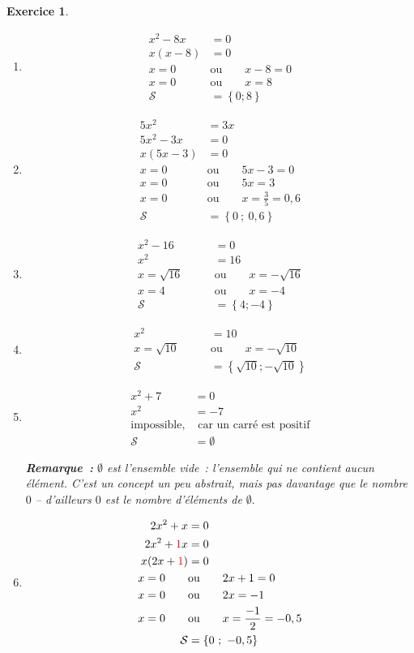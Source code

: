 \documentclass[10pt]{article}
\newtheorem{exo}{Exercice}
\begin{document}
\begin{exo}
\begin{multicols}{2}
\begin{enumerate}
\item \begin{align*}x^2-8x&=0\\
x(x-8)&=0\\
x=0 \qquad &\text{ou}\qquad x-8=0\\
x=0  \qquad &\text{ou}\qquad x=8\\
\mathcal{S}&=\left\{0;8\right\}
\end{align*}
\item \begin{align*}5x^2&=3x\\
5x^2-3x&=0\\
x(5x-3)&=0\\
x=0 \qquad &\text{ou}\qquad 5x-3=0\\
x=0 \qquad &\text{ou}\qquad 5x=3\\
x=0  \qquad &\text{ou}\qquad x=\frac{3}{5}=0,6\\
\mathcal{S}&=\left\{0~;~0,6\right\}
\end{align*}
\item \begin{align*}x^2-16&=0\\
x^2&=16\\
x=\sqrt{16} \qquad &\text{ou}\qquad x=-\sqrt{16}\\
x=4  \qquad &\text{ou}\qquad x=-4\\
\mathcal{S}&=\left\{4;-4\right\}
\end{align*}

\item \begin{align*}
x^2&=10\\
x=\sqrt{10} \qquad &\text{ou}\qquad x=-\sqrt{10}\\
\mathcal{S}&=\left\{\sqrt{10};-\sqrt{10}\right\}
\end{align*}
\item \begin{align*}x^2+7&=0\\
x^2&=-7\\
\text{impossible,}&\text{ car un carré est positif}\\
\mathcal{S}&=\emptyset
\end{align*}

\medskip

\textbf{Remarque~:} $\emptyset$ est l'ensemble vide~: l'ensemble qui ne contient aucun élément. C'est un concept un peu abstrait, mais pas davantage que le nombre $0$ -- d'ailleurs $0$ est le nombre d'éléments de $\emptyset.$
\item \begin{align*}
2x^2+x&=0\\2x^2+\textcolor{red}{1}x&=0\\
x(2x+\textcolor{red}{1})&=0\\
x=0 \qquad &\text{ou}\qquad 2x+1=0\\
x=0 \qquad &\text{ou}\qquad 2x=-1\\
x=0  \qquad &\text{ou}\qquad x=\frac{-1}{2}=-0,5\\
\mathcal{S}&=\left\{0~;~-0,5\right\}
\end{align*}


\end{enumerate}
\end{multicols}
\end{exo}
\end{document}

